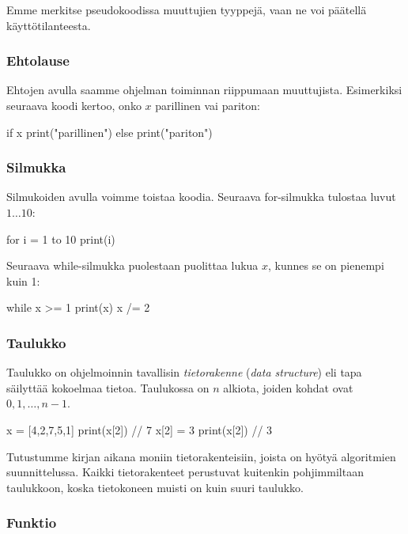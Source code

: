 Emme merkitse pseudokoodissa muuttujien tyyppejä,
vaan ne voi päätellä käyttötilanteesta.

\subsubsection{Ehtolause}

Ehtojen avulla saamme ohjelman toiminnan
riippumaan muuttujista.
Esimerkiksi seuraava koodi kertoo, onko $x$ parillinen vai pariton:

\begin{code}
if x%
    print("parillinen")
else
    print("pariton")
\end{code}

\subsubsection{Silmukka}

Silmukoiden avulla voimme toistaa koodia.
Seuraava for-silmukka tulostaa luvut $1 \dots 10$:

\begin{code}
for i = 1 to 10
    print(i)
\end{code}

Seuraava while-silmukka puolestaan puolittaa lukua $x$,
kunnes se on pienempi kuin 1:

\begin{code}
while x >= 1
    print(x)
    x /= 2
\end{code}

\subsubsection{Taulukko}


Taulukko on ohjelmoinnin tavallisin \emph{tietorakenne}
(\emph{data structure})
eli tapa säilyttää kokoelmaa tietoa.
Taulukossa on $n$ alkiota, joiden kohdat ovat $0,1,\dots,n-1$.

\begin{code}
x = [4,2,7,5,1]
print(x[2]) // 7
x[2] = 3
print(x[2]) // 3
\end{code}

Tutustumme kirjan aikana moniin tietorakenteisiin,
joista on hyötyä algoritmien suunnittelussa.
Kaikki tietorakenteet perustuvat kuitenkin pohjimmiltaan taulukkoon,
koska tietokoneen muisti on kuin suuri taulukko.

\subsubsection{Funktio}

